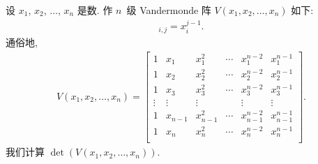 \documentclass[../libro.tex]{subfiles}
\begin{document}
\begin{example}
    设 \(x_1\), \(x_2\), \(\dots\), \(x_n\) 是数.
    作 \(n\)~级 Vandermonde 阵
    \(V(x_1, x_2, \dots, x_n)\) 如下:
    \begin{align*}
        [V(x_1, x_2, \dots, x_n)]_{i,j}
        = x_i^{j-1}.
    \end{align*}
    通俗地,
    \begin{align*}
        V(x_1, x_2, \dots, x_n)
        =
        \begin{bmatrix}
            1      & x_1     & x_1^2     & \cdots & x_1^{n-2}     & x_1^{n-1}     \\
            1      & x_2     & x_2^2     & \cdots & x_2^{n-2}     & x_2^{n-1}     \\
            1      & x_3     & x_3^2     & \cdots & x_3^{n-2}     & x_3^{n-1}     \\
            \vdots & \vdots  & \vdots    & {}     & \vdots        & \vdots        \\
            1      & x_{n-1} & x_{n-1}^2 & \cdots & x_{n-1}^{n-2} & x_{n-1}^{n-1} \\
            1      & x_n     & x_n^2     & \cdots & x_n^{n-2}     & x_n^{n-1}     \\
        \end{bmatrix}.
    \end{align*}
    我们计算 \(\det {(V(x_1, x_2, \dots, x_n))}\).


\end{example}
\end{document}
